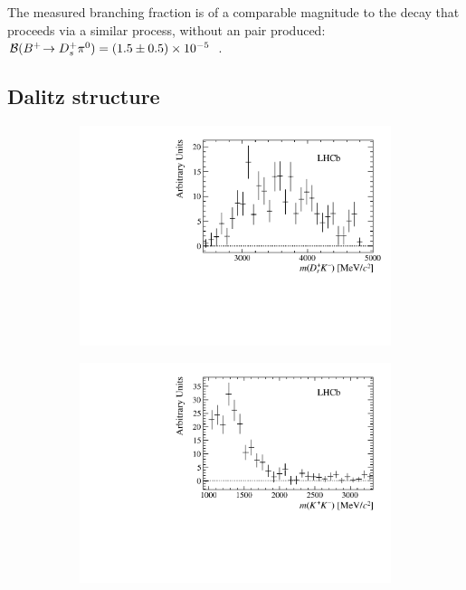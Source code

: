 The measured \decay{\Bp}{\Dsp\Kp\Km} branching fraction is of a comparable magnitude to the decay \decay{\Bp}{\Dsp\piz} that proceeds via a similar process, without an \squark\squarkbar pair produced: $\mathcal{B}({{{B}^+}}\!\rightarrow {\ensuremath{{D}^+_{s}}} {\ensuremath{{\pi}^0}}) = (1.5 \pm 0.5) \times 10^{-5}$~\cite{Aubert:2006xy}.  

\subsection{Dalitz structure}


\begin{figure}[!h]
    \centering
    \begin{subfigure}[t]{0.49\textwidth}
        \includegraphics[width=1.0\textwidth]{figs/B2DsKK/DsKm_mass_sweighted.pdf}
    \end{subfigure}
    \begin{subfigure}[t]{0.49\textwidth}
        \includegraphics[width=1.0\textwidth]{figs/B2DsKK/phi_mass_sweighted.pdf}

\end{subfigure}
\end{figure}
